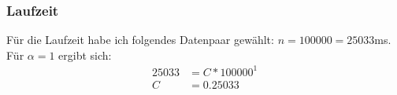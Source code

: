 \documentclass[ngerman,a4paper]{report}
\begin{document}
\subsubsection*{Laufzeit}
Für die Laufzeit habe ich folgendes Datenpaar gewählt: $n = 100000 = 25033$ms.\\
Für $\alpha = 1$ ergibt sich:
\begin{align*}
25033 &= C * 100000^1\\
C &= 0.25033\\
\end{align*}
\end{document}
